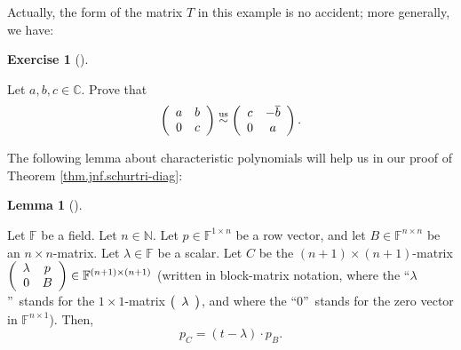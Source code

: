 \documentclass[numbers=enddot,12pt,final,onecolumn,notitlepage]{scrartcl}%
\newcounter{exer}
\numberwithin{exer}{subsection}
\theoremstyle{definition}
\newtheorem{lem}[theo]{Lemma}
\newenvironment{lemma}[1][]
{\begin{lem}[#1]\begin{leftbar}}
{\end{leftbar}\end{lem}}
\newtheorem{exmp}[exer]{Exercise}
\newenvironment{exercise}[1][]
{\begin{exmp}[#1]\begin{leftbar}}
{\end{leftbar}\end{exmp}}
\begin{document}
Actually, the form of the matrix $T$ in this example is no accident; more
generally, we have:

\begin{exercise}
\label{exe.jnf.schurtri-diag.2x2} Let $a,b,c\in\mathbb{C}$. Prove that%
\[
\left(
\begin{array}
[c]{cc}%
a & b\\
0 & c
\end{array}
\right)  \overset{\operatorname*{us}}{\sim}\left(
\begin{array}
[c]{cc}%
c & -\overline{b}\\
0 & a
\end{array}
\right)  .
\]

\end{exercise}

The following lemma about characteristic polynomials will help us in our proof
of Theorem \ref{thm.jnf.schurtri-diag}:

\begin{lemma}
\label{lem.jnf.schurtri-diag.descend-poly}Let $\mathbb{F}$ be a field. Let
$n\in\mathbb{N}$. Let $p\in\mathbb{F}^{1\times n}$ be a row vector, and let
$B\in\mathbb{F}^{n\times n}$ be an $n\times n$-matrix. Let $\lambda
\in\mathbb{F}$ be a scalar. Let $C$ be the $\left(  n+1\right)  \times\left(
n+1\right)  $-matrix $\left(
\begin{array}
[c]{cc}%
\lambda & p\\
0 & B
\end{array}
\right)  \in\mathbb{F}^{\left(  n+1\right)  \times\left(  n+1\right)  }$
(written in block-matrix notation, where the \textquotedblleft$\lambda
$\textquotedblright\ stands for the $1\times1$-matrix $\left(
\begin{array}
[c]{c}%
\lambda
\end{array}
\right)  $, and where the \textquotedblleft$0$\textquotedblright\ stands for
the zero vector in $\mathbb{F}^{n\times1}$). Then,
\[
p_{C}=\left(  t-\lambda\right)  \cdot p_{B}.
\]

\end{lemma}
\end{document}
